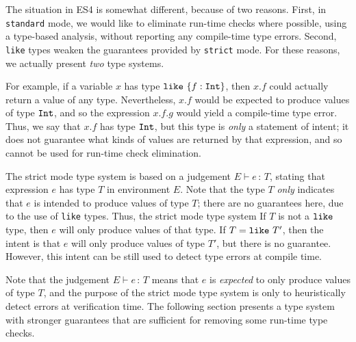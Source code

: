 \documentclass{article}
\newcommand{\judge}[2]{\ensuremath{\Gamma\vdash{#1}:{#2}}}
\newcommand{\Int}{\t{Int}}
\renewcommand{\t}[1]{{\tt #1}}
\renewcommand{\judge}[3]{#1\vdash #2\,:\,#3}
\newcommand{\objty}[1]{\{#1\}}
\newcommand{\objget}[2]{#1.#2}
\newcommand{\likety}[1]{\t{like}~#1}
\begin{document}
The situation in ES4 is somewhat different, because of two reasons. First, in \t{standard} mode, we would like to eliminate run-time checks where possible, using a type-based analysis,
without reporting any compile-time type errors.
Second, \t{like} types weaken the guarantees provided by \t{strict} mode.
For these reasons, we actually present \emph{two} type systems.

For example, if a variable $x$ has type $\likety{\objty{f:\Int}}$,
then $\objget x f$  could actually return a value of any type.  
Nevertheless, 
$\objget x f$
would be expected to produce values of type $\Int$, and so 
the expression
$\objget{\objget x f} g$ would yield a compile-time type error.
Thus, we say that $\objget x f$ has type $\Int$, but this type is \emph{only} a statement of intent;
it does not guarantee what kinds of values are returned by that expression,
and so cannot be used for run-time check elimination.



The strict mode type system is based on a judgement $\judge{E}{e}{T}$,
stating that expression $e$ has type $T$ in environment $E$.
Note that the type $T$ \emph{only} indicates that $e$ is intended to produce values of type $T$; there are no guarantees here, due to the use of \t{like} types. Thus, the strict mode type system 
If $T$ is not a $\likety{}$ type, then $e$ will only produce values of that type.
If $T=\likety{T'}$, then the intent is that $e$ will only produce values of type $T'$,
but there is no guarantee. However, this intent can be still used to detect type errors at compile time.

Note that the judgement $\judge{E}{e}{T}$ means that $e$ is \emph{expected} to only produce values of type $T$,
and the purpose of the strict mode type system is only to heuristically detect errors at verification time.
The following section presents a type system with stronger guarantees that are sufficient for removing some run-time type checks.
\end{document}
